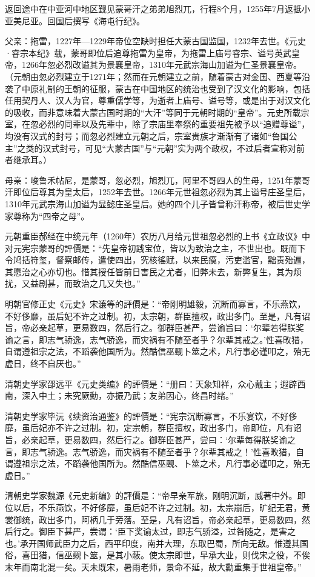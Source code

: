 返回途中在中亚河中地区觐见蒙哥汗之弟弟旭烈兀，行程8个月，1255年7月返抵小亚美尼亚。回国后撰写《海屯行纪》。

父亲：拖雷，1227年—1229年帝位空缺时担任大蒙古国监国，1232年去世。《元史·睿宗本纪》载，蒙哥即位后追尊拖雷为皇帝，为拖雷上庙号睿宗、谥号英武皇帝，1266年忽必烈改谥其为景襄皇帝，1310年元武宗海山加谥为仁圣景襄皇帝。（元朝由忽必烈建立于1271年；然而在元朝建立之前，随着蒙古对金国、西夏等沿袭了中原礼制的王朝的征服，蒙古在中国地区的统治也受到了汉文化的影响，包括任用契丹人、汉人为官，尊重儒学等，为逝者上庙号、谥号等，或是出于对汉文化的吸收，而非意味着大蒙古国时期的“大汗”等同于元朝时期的“皇帝”。元史所载宗室，在忽必烈的同辈以及先辈中，除了宗庙里奉祭的重要祖先被予以“追赠尊谥”，均没有汉式的封号；而忽必烈建立元朝之后，宗室贵族才渐渐有了诸如“鲁国公主”之类的汉式封号，可见“大蒙古国”与“元朝”实为两个政权，不过后者宣称对前者继承耳。）

母亲：唆鲁禾帖尼，是蒙哥，忽必烈，旭烈兀，阿里不哥四人的生母，1251年蒙哥汗即位后尊其为皇太后，1252年去世。1266年元世祖忽必烈为其上谥号庄圣皇后，1310年元武宗海山加谥为显懿庄圣皇后。她的四个儿子皆曾称汗称帝，被后世史学家尊称为“四帝之母”。

元朝重臣郝经在中统元年（1260年）农历八月给元世祖忽必烈的上书《立政议》中对元宪宗蒙哥的評價是：“先皇帝初践宝位，皆以为致治之主，不世出也。既而下令鸠括符玺，督察邮传，遣使四出，究核徭赋，以来民瘼，污吏滥官，黜责殆遍，其愿治之心亦切也。惜其授任皆前日害民之尤者，旧弊未去，新弊复生，其为烦扰，又益剧甚，而致治之几又失也。”

明朝官修正史《元史》宋濂等的評價是：“帝刚明雄毅，沉断而寡言，不乐燕饮，不好侈靡，虽后妃不许之过制。初，太宗朝，群臣擅权，政出多门。至是，凡有诏旨，帝必亲起草，更易数四，然后行之。御群臣甚严，尝谕旨曰：‘尔辈若得朕奖谕之言，即志气骄逸，志气骄逸，而灾祸有不随至者乎？尔辈其戒之。’性喜畋猎，自谓遵祖宗之法，不蹈袭他国所为。然酷信巫觋卜筮之术，凡行事必谨叩之，殆无虚日，终不自厌也。”

清朝史学家邵远平《元史类编》的評價是：“册曰：天象知祥，众心戴主；遐辟西南，深入中土；未究厥勳，亦振乃武；友弟因心，终昌时绪。”

清朝史学家毕沅《续资治通鉴》的評價是：“宪宗沉断寡言，不乐宴饮，不好侈靡，虽后妃亦不许之过制。初，定宗朝，群臣擅权，政出多门，帝即位，凡有诏旨，必亲起草，更易数四，然后行之。御群臣甚严，尝曰：‘尔辈每得朕奖谕之言，即志气骄逸。志气骄逸，而灾祸有不随至者乎？尔辈其戒之！’性喜畋猎，自谓遵祖宗之法，不蹈袭他国所为。然酷信巫觋、卜筮之术，凡行事必谨叩之，殆无虚日。”

清朝史学家魏源《元史新编》的評價是：“帝早亲军旅，刚明沉断，威著中外。即位以后，不乐燕饮，不好侈靡，虽后妃不许之过制。初，太宗崩后，旷纪无君，黄裳御统，政出多门，阿柄几于旁落。至是，凡有诏旨，帝必亲起草，更易数四，然后行之。御臣下甚严，尝谓：‘臣下奖谕太过，即志气骄溢，过咎随之，是害之也。’承开国师武臣力之后，西平印度，南并大理，东取巴蜀，所向无敌。惟遵其国俗，喜田猎，信巫觋卜筮，是其小蔽。使太宗即世，早承大业，则伐宋之役，不俟末年而南北混一矣。天未既宋，暑雨老师，景命不延，故大勳重集于世祖皇帝。”

